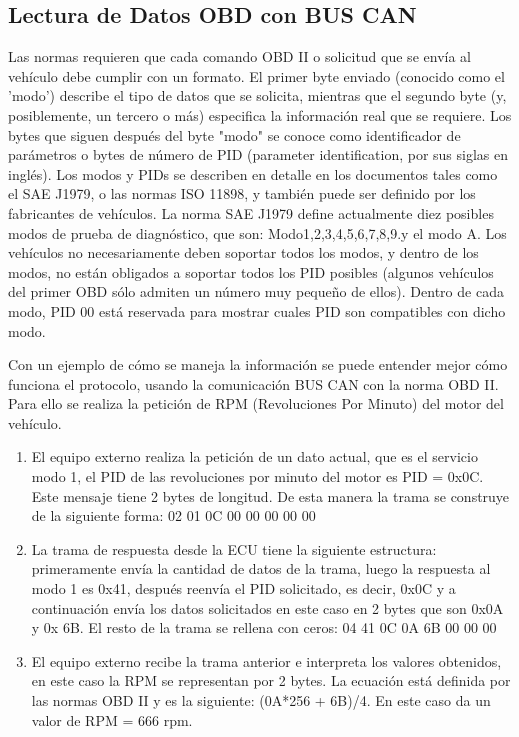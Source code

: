 \subsection {Lectura de Datos OBD con BUS CAN}

Las normas requieren que cada comando OBD II o solicitud que se envía al vehículo debe cumplir con un formato. El primer byte enviado (conocido como el 'modo') describe el tipo de datos que se solicita, mientras que el segundo byte (y, posiblemente, un tercero o más) especifica la información real que se requiere.
Los bytes que siguen después del byte "modo" se conoce como  identificador de parámetros o bytes de número de PID (parameter identification, por sus siglas en inglés). Los modos y PIDs se describen en detalle en los documentos tales como el SAE J1979, o las normas ISO 11898, y también puede ser definido por los fabricantes de vehículos. La norma SAE J1979 define actualmente diez posibles modos de prueba de diagnóstico, que son:
Modo1,2,3,4,5,6,7,8,9.y el modo A.
Los vehículos no necesariamente deben soportar todos los modos, y dentro de los modos, no están obligados a soportar todos los PID posibles (algunos vehículos del primer OBD sólo admiten un número muy pequeño de ellos). 
Dentro de cada modo, PID 00 está reservada para mostrar cuales PID son compatibles con dicho modo.


Con un ejemplo de cómo se maneja la información se puede entender mejor cómo funciona el protocolo, usando la comunicación BUS CAN con la norma OBD II. Para ello se realiza la petición de RPM (Revoluciones Por Minuto) del motor del vehículo.


\begin{enumerate}
\item El equipo externo realiza la petición de un dato actual, que es el servicio modo 1, el PID de las revoluciones por minuto del motor es PID = 0x0C. Este mensaje tiene 2 bytes de longitud. De esta manera la trama se construye de la siguiente forma:  
02 01 0C 00 00 00 00 00
\item La trama de respuesta desde la ECU tiene la siguiente estructura: primeramente envía la cantidad de datos de la trama, luego la respuesta al modo 1 es 0x41, después reenvía el PID solicitado, es decir, 0x0C y a continuación envía los datos solicitados en este caso en 2 bytes que son 0x0A y 0x 6B. El resto de la trama se rellena con ceros: 04 41 0C 0A 6B 00 00 00
\item El equipo externo recibe la trama anterior e interpreta los valores obtenidos, en este caso la RPM se representan por 2 bytes. La ecuación está definida por las  normas OBD II y es la siguiente: (0A*256 + 6B)/4. En este caso da un valor de RPM = 666 rpm. 
\end{enumerate}

